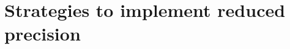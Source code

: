 \chapter{Strategies to implement reduced precision}
\begin{comment}
    Discuss:
    1. Specialized Hardware
    2. Software implementation
    3. Compare both strategies
\end{comment}

